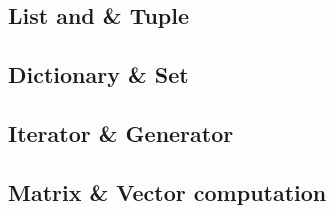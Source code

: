 \documentclass{article}
\begin{document}
	\subsection{List and \& Tuple}
	
	\subsection{Dictionary \& Set}

	\subsection{Iterator \& Generator}

	\subsection{Matrix \& Vector computation}
\end{document}
